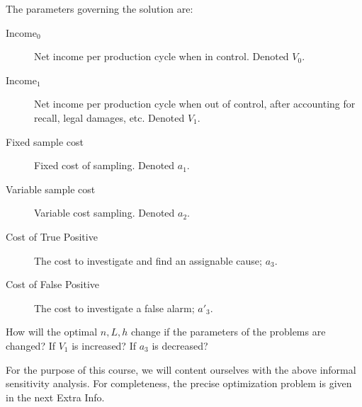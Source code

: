 The parameters governing the solution are:
\begin{description}
\item[Income$_0$ ] Net income per production cycle when in control. Denoted $V_0$.
\item[Income$_1$] Net income per production cycle when out of control, after accounting for recall, legal damages, etc. Denoted $V_1$.
\item[Fixed sample cost] Fixed cost of sampling. Denoted $a_1$. 
\item[Variable sample cost] Variable cost sampling. Denoted $a_2$.
\item[Cost of True Positive] The cost to investigate and find an assignable cause; $a_3$.
\item[Cost of False Positive] The cost to investigate a false alarm; $a'_3$.
\end{description}


\begin{think}
How will the optimal $n,L,h$ change if the parameters of the problems are changed?
If $V_1$ is increased?
If $a_3$ is decreased?
\end{think}

For the purpose of this course, we will content ourselves with the above informal sensitivity analysis.
For completeness, the precise optimization problem is given in the next Extra Info.

